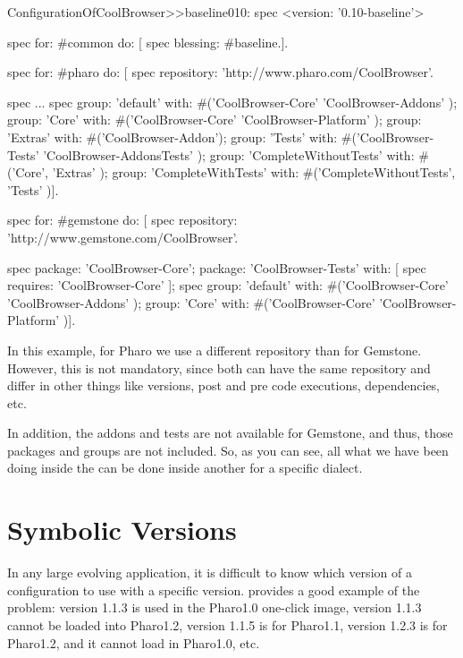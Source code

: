 \documentclass[a4paper,10pt,twoside]{book}
\begin{document}
  \begin{code}{}
 ConfigurationOfCoolBrowser>>baseline010: spec
       <version: '0.10-baseline'>

       spec for: #common do: [
              spec blessing: #baseline.].

       spec for: #pharo do: [
              spec repository: 'http://www.pharo.com/CoolBrowser'.

              spec
                     ...
              spec
                     group: 'default' with: #('CoolBrowser-Core' 'CoolBrowser-Addons' );
                     group: 'Core' with: #('CoolBrowser-Core' 'CoolBrowser-Platform' );
                     group: 'Extras' with: #('CoolBrowser-Addon');
                     group: 'Tests' with: #('CoolBrowser-Tests' 'CoolBrowser-AddonsTests' );
                     group: 'CompleteWithoutTests' with: #('Core', 'Extras' );
                     group: 'CompleteWithTests' with: #('CompleteWithoutTests', 'Tests' )].

       spec for: #gemstone do: [
              spec repository: 'http://www.gemstone.com/CoolBrowser'.

              spec
                     package: 'CoolBrowser-Core';
                     package: 'CoolBrowser-Tests' with: [ spec requires: 'CoolBrowser-Core' ];
              spec
                     group: 'default' with: #('CoolBrowser-Core' 'CoolBrowser-Addons' );
                     group: 'Core' with: #('CoolBrowser-Core' 'CoolBrowser-Platform' )].

\end{code}

In this example, for Pharo we use a different repository than for Gemstone. However, this is not mandatory, since both can have the same repository and differ in other things like versions, post and pre code executions, dependencies, etc.

In addition, the addons and tests are not available for Gemstone, and thus, those packages and groups are not included. So, as you can see, all what we have been doing inside the  can be done inside another  for a specific dialect.


\section{Symbolic Versions}
In any large evolving application, it is difficult to know which version of a configuration to use with a specific version.
 provides a good example of the problem: version 1.1.3 is used in the Pharo1.0 one-click image,  version 1.1.3 cannot be loaded into Pharo1.2, version 1.1.5 is for Pharo1.1, version 1.2.3 is for Pharo1.2, and it cannot load in Pharo1.0, etc.
\end{document}
